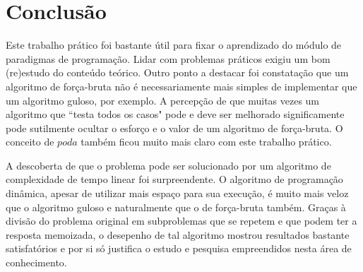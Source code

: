 \documentclass[a4paper,12pt,titlepage]{article}
\begin{document}
\section{Conclusão}
Este trabalho prático foi bastante útil para fixar o aprendizado do módulo de paradigmas de programação. Lidar com problemas práticos exigiu um bom (re)estudo do conteúdo teórico. Outro ponto a destacar foi constatação que um algoritmo de força-bruta não é necessariamente mais simples de implementar que um algoritmo guloso, por exemplo. A percepção de que muitas vezes um algoritmo que ``testa todos os casos" pode e deve ser melhorado significamente pode sutilmente ocultar o esforço e o valor de um algoritmo de força-bruta. O conceito de $poda$ também ficou muito mais claro com este trabalho prático.

A descoberta de que o problema pode ser solucionado por um algoritmo de complexidade de tempo linear foi surpreendente. O algoritmo de programação dinâmica, apesar de utilizar mais espaço para sua execução, é muito mais veloz que o algoritmo guloso e naturalmente que o de força-bruta também. Graças à divisão do problema original em subproblemas que se repetem e que podem ter a resposta memoizada, o desepenho de tal algoritmo mostrou resultados bastante satisfatórios e por si só justifica o estudo e pesquisa empreendidos nesta área de conhecimento.

\begin{comment}
\begin{figure}[H]
     \centering
     \caption{}
     \label{bsp}
\end{figure}
\end{comment}


\newpage
\end{document}
